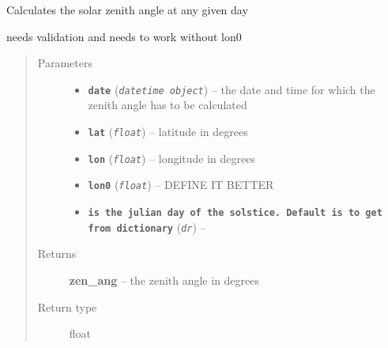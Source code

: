 \documentclass[a4paper,10pt,oneside]{sphinxmanual}
\begin{document}
\begin{fulllineitems}
\label{pymicra:pymicra.physics.solarZenith}
Calculates the solar zenith angle at any given day

needs validation and needs to work without lon0
\begin{quote}\begin{description}
\item[{Parameters}] \leavevmode\begin{itemize}
\item {} 
\textbf{\texttt{date}} (\emph{\texttt{datetime object}}) -- the date and time for which the zenith angle has to be calculated

\item {} 
\textbf{\texttt{lat}} (\emph{\texttt{float}}) -- latitude in degrees

\item {} 
\textbf{\texttt{lon}} (\emph{\texttt{float}}) -- longitude in degrees

\item {} 
\textbf{\texttt{lon0}} (\emph{\texttt{float}}) -- DEFINE IT BETTER

\item {} 
\textbf{\texttt{is the julian day of the solstice. Default is to get from dictionary}} (\emph{\texttt{dr}}) -- 

\end{itemize}

\item[{Returns}] \leavevmode
\textbf{zen\_ang} -- the zenith angle in degrees

\item[{Return type}] \leavevmode
float

\end{description}\end{quote}

\end{fulllineitems}

\end{document}
